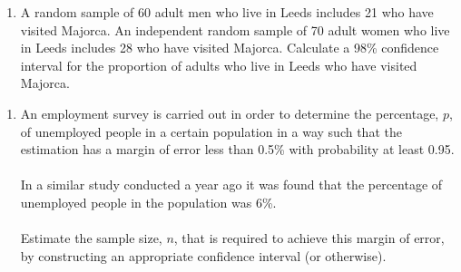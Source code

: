 \documentclass[a4paper,12pt]{article}
\begin{document}
\begin{enumerate}


\item A random sample of 60 adult men who live in Leeds includes 21 who have visited Majorca. An independent random sample of 70 adult women who live in Leeds includes 28 who have visited Majorca.
Calculate a 98\% confidence interval for the proportion of adults who live in Leeds
who have visited Majorca.


\end{enumerate}

\newpage


\begin{enumerate}

\item
An employment survey is carried out in order to determine the percentage, $p$, of
	unemployed people in a certain population in a way such that the estimation has a margin of error less than 0.5\% with probability at least 0.95. \\ \\
	\noindent In a similar study conducted a year ago it was found that the percentage of unemployed people in the
	population was 6\%.\\\\
	 Estimate the sample size, $n$, that is required to achieve this margin of error, by
	constructing an appropriate confidence interval (or otherwise).
\end{enumerate}
\end{document}
